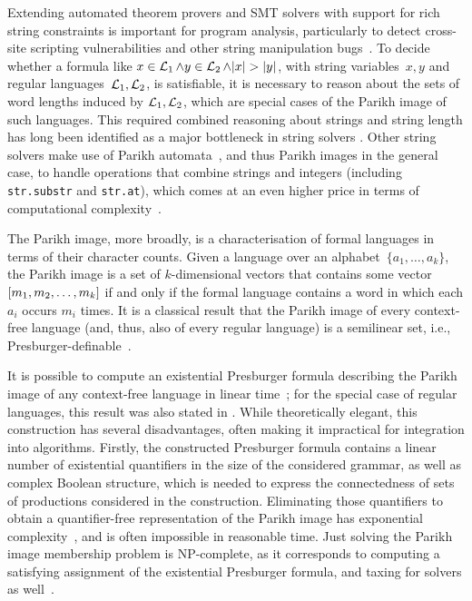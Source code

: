 Extending automated theorem provers and SMT solvers with support for rich string
constraints is important for program analysis, particularly to detect cross-site
scripting vulnerabilities and other string manipulation
bugs~\cite{DBLP:books/sp/BultanYAA17}.
%
To decide whether a formula like $x \in \operatorname{\mathcal{L}}_1 \wedge y \in \operatorname{\mathcal{L}}_2
\wedge |x| > |y|$, with string variables~$x, y$ and regular
languages~$\operatorname{\mathcal{L}}_1, \operatorname{\mathcal{L}}_2$, is satisfiable, it is necessary to reason
about the sets of word lengths induced by $\operatorname{\mathcal{L}}_1, \operatorname{\mathcal{L}}_2$, which are
special cases of the Parikh image of such languages.
This required combined reasoning about
strings and string length has long been identified as a major bottleneck in
string solvers
\cite{DBLP:conf/cav/AbdullaACHRRS15,length-aware-solver,approximate-parikh,DBLP:journals/corr/BerzishZG17}.
Other string solvers make use of Parikh automata~\cite{parikh-automata}, and
thus Parikh images in the general case, to handle operations that combine
strings and integers (including
\verb!str.substr!  and \verb!str.at!), which comes at an even higher price in
terms of computational complexity~\cite{ostrich-plus}.

The Parikh image, more broadly, is a characterisation of formal languages in
terms of their character counts. Given a language over an alphabet~$\{a_1,
\ldots, a_k\}$, the Parikh image is a set of $k$-dimensional vectors that
contains some vector~$\left[{m_1, m_2, \ldots, m_k}\right]$ if and only if the
formal language contains a word in which each $a_i$ occurs $m_i$ times. It is a
classical result that the Parikh image of every context-free language (and,
thus, also of every regular language) is a semilinear set,
i.e., Presburger-definable~\cite{parikh-theorem}.

It is possible to compute an existential Presburger formula describing the
Parikh image of any context-free language in linear
time~\cite{generate-parikh-image}; for the special case of regular languages,
this result was also stated in \cite{muscholl-linear}. While theoretically
elegant, this construction has several disadvantages, often making it
impractical for integration into algorithms. Firstly, the constructed Presburger
formula contains a linear number of existential quantifiers in the size of the
considered grammar, as well as complex Boolean structure, which is needed to
express the connectedness of sets of productions considered in the construction.
Eliminating those quantifiers to obtain a quantifier-free representation of the
Parikh image has exponential complexity~\cite{DBLP:conf/issac/Weispfenning97},
and is often impossible in reasonable time. Just solving the Parikh image
membership problem is NP-complete, as it corresponds to computing a satisfying
assignment of the existential Presburger formula, and taxing for solvers as
well~\cite{ostrich-plus}.

